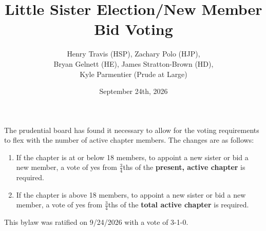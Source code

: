 \documentclass{article}
\title{Little Sister Election/New Member Bid Voting}
\author{Henry Travis (HSP), Zachary Polo (HJP), \\Bryan Gelnett (HE), James Stratton-Brown (HD), \\Kyle Parmentier (Prude at Large)}
\date{September 24th, 2026}
\begin{document}
	
	\maketitle
	
	The prudential board has found it necessary to allow for the voting requirements to flex with the number of active chapter members. The changes are as follows:
	
	\begin{enumerate}
		\item If the chapter is at or below 18 members, to appoint a new sister or bid a new member, a vote of yes from $\frac{3}{4}$ths of the \textbf{present, active chapter} is required.	
		\item If the chapter is above 18 members, to appoint a new sister or bid a new member, a vote of yes from $\frac{3}{4}$ths of the \textbf{total active chapter} is required.
	\end{enumerate}
	
	This bylaw was ratified on 9/24/2026 with a vote of 3-1-0.
\end{document}
